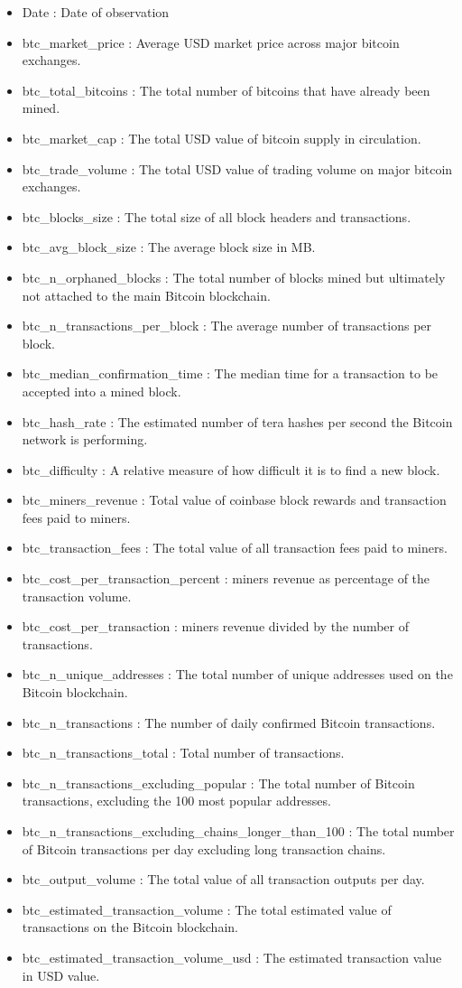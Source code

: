 \documentclass{article}
\begin{document}
\begin{itemize}
 
\item Date : Date of observation
\item btc\_market\_price : Average USD market price across major bitcoin exchanges.
\item btc\_total\_bitcoins : The total number of bitcoins that have already been mined.
\item btc\_market\_cap : The total USD value of bitcoin supply in circulation.
\item btc\_trade\_volume : The total USD value of trading volume on major bitcoin exchanges.
\item btc\_blocks\_size : The total size of all block headers and transactions.
\item btc\_avg\_block\_size : The average block size in MB.
\item btc\_n\_orphaned\_blocks : The total number of blocks mined but ultimately not attached to the main Bitcoin blockchain.
\item btc\_n\_transactions\_per\_block : The average number of transactions per block.
\item btc\_median\_confirmation\_time : The median time for a transaction to be accepted into a mined block.
\item btc\_hash\_rate : The estimated number of tera hashes per second the Bitcoin network is performing.
\item btc\_difficulty : A relative measure of how difficult it is to find a new block.
\item btc\_miners\_revenue : Total value of coinbase block rewards and transaction fees paid to miners.
\item btc\_transaction\_fees : The total value of all transaction fees paid to miners.
\item btc\_cost\_per\_transaction\_percent : miners revenue as percentage of the transaction volume.
\item btc\_cost\_per\_transaction : miners revenue divided by the number of transactions.
\item btc\_n\_unique\_addresses : The total number of unique addresses used on the Bitcoin blockchain.
\item btc\_n\_transactions : The number of daily confirmed Bitcoin transactions.
\item btc\_n\_transactions\_total : Total number of transactions.
\item btc\_n\_transactions\_excluding\_popular : The total number of Bitcoin transactions, excluding the 100 most popular addresses.
\item btc\_n\_transactions\_excluding\_chains\_longer\_than\_100 : The total number of Bitcoin transactions per day excluding long transaction chains.
\item btc\_output\_volume : The total value of all transaction outputs per day.
\item btc\_estimated\_transaction\_volume : The total estimated value of transactions on the Bitcoin blockchain.
\item btc\_estimated\_transaction\_volume\_usd : The estimated transaction value in USD value.
\end{itemize}
\end{document}
